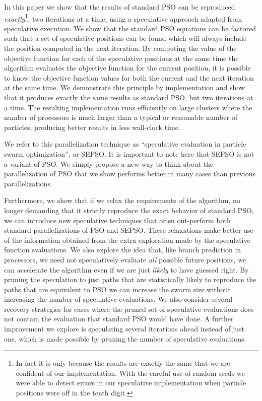 \documentclass[ms,electronic,twosidetoc,letterpaper,chaptercenter,parttop,equalmargins]{byumsphd}
\begin{document}
In this paper we show that the results of standard PSO can be reproduced
\emph{exactly}\footnote{In fact it is only because the results are exactly the
same that we are confident of our implementation.  With the careful use of
random seeds we were able to detect errors in our speculative implementation
when particle positions were off in the tenth digit.}, two iterations at a
time, using a speculative approach adapted from speculative execution. We show
that the standard PSO equations can be factored such that a set of speculative
positions can be found which will always include the position computed in the
next iteration.  By computing the value of the objective function for each of
the speculative positions at the same time the algorithm evaluates the
objective function for the current position, it is possible to know the
objective function values for both the current and the next iteration at the
same time.  We demonstrate this principle by implementation and show that it
produces exactly the same results as standard PSO, but two iterations at a
time.  The resulting implementation runs efficiently on large clusters where
the number of processors is much larger than a typical or reasonable number of
particles, producing better results in less wall-clock time.

We refer to this parallelization technique as ``speculative evaluation in
particle swarm optimization'', or SEPSO.  It is important to note here that
SEPSO is not a variant of PSO.  We simply propose a new way to think about the
parallelization of PSO that we show performs better in many cases than previous
parallelizations.

Furthermore, we show that if we relax the requirements of the algorithm, no
longer demanding that it strictly reproduce the exact behavior of standard PSO,
we can introduce new speculative techniques that often out-perform both
standard parallelizations of PSO and SEPSO.  These relaxations make better use
of the information obtained from the extra exploration made by the speculative
function evaluations.  We also explore the idea that, like branch prediction in
processors, we need not speculatively evaluate \emph{all} possible future
positions, we can accelerate the algorithm even if we are just \emph{likely} to
have guessed right.  By pruning the speculation to just paths that are
statistically likely to reproduce the paths that are equivalent to PSO we can
increase the swarm size without increasing the number of speculative
evaluations.  We also consider several recovery strategies for cases where the
pruned set of speculative evaluations does not contain the evaluation that
standard PSO would have done.  A further improvement we explore is speculating
several iterations ahead instead of just one, which is made possible by pruning
the number of speculative evaluations.
\end{document}
